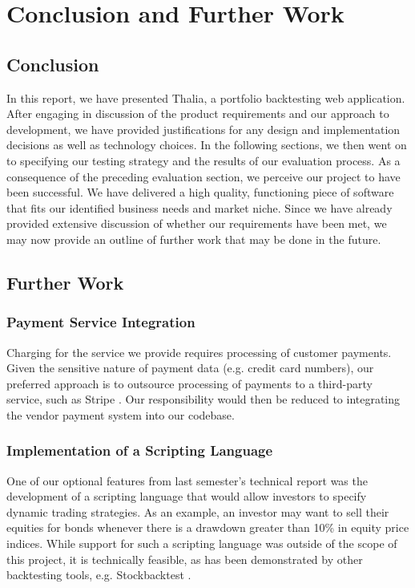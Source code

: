 \documentclass[main.tex]{subfiles}
\begin{document}
\section{Conclusion and Further Work}

\subsection{Conclusion}

In this report, we have presented Thalia, a portfolio backtesting web application. After engaging in discussion of the product requirements and our approach to development, we have provided justifications for any design and implementation decisions as well as technology choices. In the following sections, we then went on to specifying our testing strategy and the results of our evaluation process. \newline
As a consequence of the preceding evaluation section, we perceive our project to have been successful. We have delivered a high quality, functioning piece of software that fits our identified business needs and market niche. Since we have already provided extensive discussion of whether our requirements have been met, we may now provide an outline of further work that may be done in the future.

\subsection{Further Work}

\subsubsection{Payment Service Integration}

Charging for the service we provide requires processing of customer payments. Given the sensitive nature of payment data (e.g. credit card numbers), our preferred approach is to outsource processing of payments to a third-party service, such as Stripe \cite{stripe}. Our responsibility would then be reduced to integrating the vendor payment system into our codebase.

\subsubsection{Implementation of a Scripting Language}

One of our optional features from last semester's technical report was the development of a scripting language that would allow investors to specify dynamic trading strategies. As an example, an investor may want to sell their equities for bonds whenever there is a drawdown greater than 10\% in equity price indices. While support for such a scripting language was outside of the scope of this project, it is technically feasible, as has been demonstrated by other backtesting tools, e.g. Stockbacktest \cite{stockbacktest}.
\end{document}
